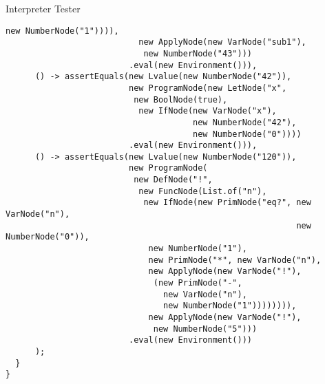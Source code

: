 \begin{cl}{Interpreter Tester}
\begin{lstlisting}[language=MyJava]
                            new NumberNode("1")))),
                           new ApplyNode(new VarNode("sub1"),
                            new NumberNode("43")))
                         .eval(new Environment())),
      () -> assertEquals(new Lvalue(new NumberNode("42")),
                         new ProgramNode(new LetNode("x",
                          new BoolNode(true),
                           new IfNode(new VarNode("x"),
                                      new NumberNode("42"),
                                      new NumberNode("0"))))
                         .eval(new Environment())),
      () -> assertEquals(new Lvalue(new NumberNode("120")),
                         new ProgramNode(
                          new DefNode("!",
                           new FuncNode(List.of("n"),
                            new IfNode(new PrimNode("eq?", new VarNode("n"), 
                                                           new NumberNode("0")),
                             new NumberNode("1"),
                             new PrimNode("*", new VarNode("n"),
                             new ApplyNode(new VarNode("!"),
                              (new PrimNode("-",
                                new VarNode("n"),
                                new NumberNode("1")))))))),
                             new ApplyNode(new VarNode("!"),
                              new NumberNode("5")))
                         .eval(new Environment()))
      );
  }
}
\end{lstlisting}
\end{cl}